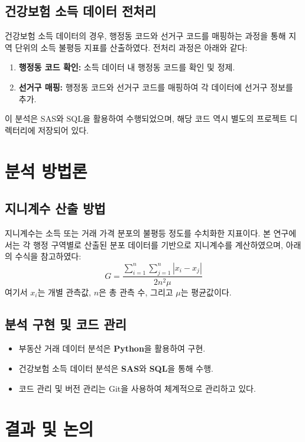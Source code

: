 \documentclass[a4paper,10pt]{article}
\begin{document}
\subsection{건강보험 소득 데이터 전처리}
건강보험 소득 데이터의 경우, 행정동 코드와 선거구 코드를 매핑하는 과정을 통해 지역 단위의 소득 불평등 지표를 산출하였다. 전처리 과정은 아래와 같다:
\begin{enumerate}
    \item \textbf{행정동 코드 확인:} 소득 데이터 내 행정동 코드를 확인 및 정제.
    \item \textbf{선거구 매핑:} 행정동 코드와 선거구 코드를 매핑하여 각 데이터에 선거구 정보를 추가.
\end{enumerate}
이 분석은 SAS와 SQL을 활용하여 수행되었으며, 해당 코드 역시 별도의 프로젝트 디렉터리에 저장되어 있다.

\section{분석 방법론}
\subsection{지니계수 산출 방법}
지니계수는 소득 또는 거래 가격 분포의 불평등 정도를 수치화한 지표이다. 본 연구에서는 각 행정 구역별로 산출된 분포 데이터를 기반으로 지니계수를 계산하였으며, 아래의 수식을 참고하였다:
\begin{equation}
    G = \frac{\sum_{i=1}^{n} \sum_{j=1}^{n} | x_i - x_j |}{2n^2 \mu}
\end{equation}
여기서 \( x_i \)는 개별 관측값, \( n \)은 총 관측 수, 그리고 \( \mu \)는 평균값이다.

\subsection{분석 구현 및 코드 관리}
\begin{itemize}
    \item 부동산 거래 데이터 분석은 \textbf{Python}을 활용하여 구현.
    \item 건강보험 소득 데이터 분석은 \textbf{SAS}와 \textbf{SQL}을 통해 수행.
    \item 코드 관리 및 버전 관리는 Git을 사용하여 체계적으로 관리하고 있다.
\end{itemize}


\newpage
\section{결과 및 논의}
\end{document}
